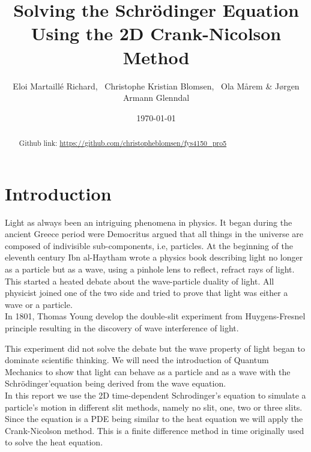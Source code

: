 \documentclass[english,notitlepage,reprint,nofootinbib]{revtex4-2}  %
\begin{document}
	
	\title{Solving the Schrödinger Equation Using the 2D Crank-Nicolson Method}  %
	\author{Eloi Martaillé Richard,
	\
	Christophe Kristian Blomsen,
	\
	Ola Mårem
	\&
	Jørgen Armann Glenndal
    }
	\date{\today}                             %
	\noaffiliation                            %
	
	\begin{abstract}
Github link: \href{https://github.com/christopheblomsen/fys4150_pro5}{https://github.com/christopheblomsen/fys4150\_pro5}
\end{abstract}
	\maketitle	
	
	
	\section{Introduction} \label{sec:introduction}

	Light as always been an intriguing phenomena in physics. It began during the ancient Greece
	period were Democritus argued that all things in the universe are composed of indivisible 
	sub-components, i.e, particles. At the beginning of the eleventh century Ibn al-Haytham 
	wrote a physics book describing light no longer as a particle but as a wave, using a 
	pinhole lens to reflect, refract rays of light. This started a heated debate about the 
	wave-particle duality of light. All physicist joined one of the two side and tried to 
	prove that light was either a wave or a particle. \\
	
	In 1801, Thomas Young develop the double-slit experiment from Huygens-Fresnel principle
	resulting in the discovery of wave interference of light\cite{ThomasYoung}.

	
	This experiment did not solve the debate but the wave property of light began to dominate 
	scientific thinking. We will need the introduction of Quantum Mechanics to show that 
	light can behave as a particle and as a wave with the Schrödinger'equation being derived 
	from the wave equation. \\
	
	In this report we use the 2D time-dependent Schrodinger's equation to simulate a particle's
	motion in different slit methods, namely no slit, one, two or three slits. Since the 
	equation is a PDE being similar to the heat equation we will apply the Crank-Nicolson method.
	This is a finite difference method in time originally used to solve the heat equation\cite{Crank1947APM}. \\
	
\end{document}
